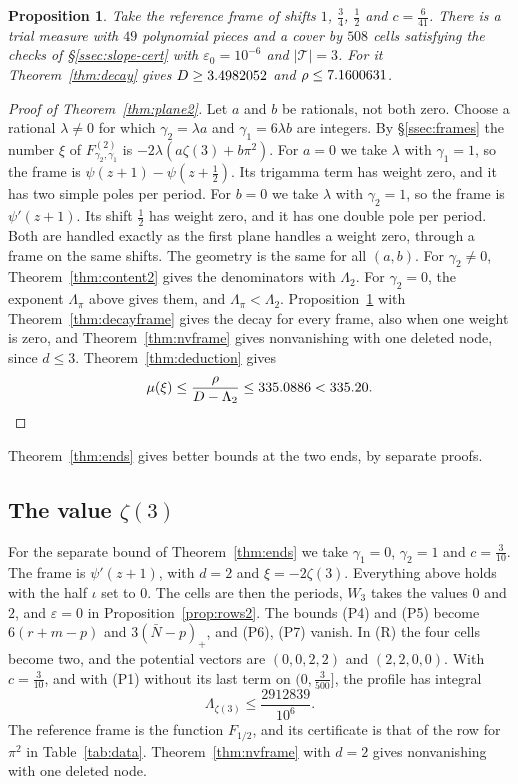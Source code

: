 \documentclass[11pt]{amsart}
\newtheorem{proposition}[theorem]{Proposition}
\theoremstyle{definition}
\theoremstyle{remark}
\numberwithin{equation}{section}
\newcommand{\MuPlaneB}{335.20}
\begin{document}
\begin{proposition}\label{prop:cert2}
Take the reference frame of shifts $1$, $\frac34$, $\frac12$ and $c=\frac6{41}$. There is a trial measure with $49$
polynomial pieces and a cover by $508$ cells satisfying the checks of \S\ref{ssec:slope-cert} with $\varepsilon_0=10^{-6}$
and $|\mathcal T|=3$. For it Theorem~\ref{thm:decay} gives $D\ge3.4982052$ and $\rho\le7.1600631$.
\end{proposition}

\begin{proof}[Proof of Theorem~\ref{thm:plane2}]
Let $a$ and $b$ be rationals, not both zero. Choose a rational $\lambda\ne0$ for which $\gamma_2=\lambda a$ and
$\gamma_1=6\lambda b$ are integers. By \S\ref{ssec:frames} the number $\xi$ of $F^{(2)}_{\gamma_2,\gamma_1}$ is
$-2\lambda(a\zeta(3)+b\pi^2)$. For $a=0$ we take $\lambda$ with $\gamma_1=1$, so the frame is
$\psi(z+1)-\psi(z+\frac12)$. Its trigamma term has weight zero, and it has two simple poles per period. For $b=0$ we
take $\lambda$ with $\gamma_2=1$, so the frame is $\psi'(z+1)$. Its shift $\frac12$ has weight zero, and it has one double pole per
period. Both are handled exactly as the first plane handles a weight zero, through a frame on the same shifts. The
geometry is the same for all $(a,b)$. For $\gamma_2\ne0$, Theorem~\ref{thm:content2} gives the denominators with
$\Lambda_2$. For $\gamma_2=0$, the exponent $\Lambda_\pi$ above gives them, and $\Lambda_\pi<\Lambda_2$.
Proposition~\ref{prop:cert2} with Theorem~\ref{thm:decayframe} gives the decay for every frame, also when one weight is
zero, and Theorem~\ref{thm:nvframe} gives nonvanishing with one deleted node, since $d\le3$. Theorem~\ref{thm:deduction}
gives
\[
 \mu(\xi)\le\frac\rho{D-\Lambda_2}\le\ExpPlB<\MuPlaneB .\qedhere
\]
\end{proof}

Theorem~\ref{thm:ends} gives better bounds at the two ends, by separate proofs.

\subsection{The value $\zeta(3)$}\label{ssec:zeta3}
For the separate bound of Theorem~\ref{thm:ends} we take $\gamma_1=0$, $\gamma_2=1$ and $c=\frac3{10}$. The frame is
$\psi'(z+1)$, with $d=2$ and $\xi=-2\zeta(3)$. Everything above holds with the half $\iota$ set to $0$. The cells are
then the periods, $W_3$ takes the values $0$ and $2$, and $\varepsilon=0$ in Proposition~\ref{prop:rows2}. The bounds (P4)
and (P5) become $6(r+m-p)$ and $3(\bar N-p)_+$, and (P6), (P7) vanish. In (R) the four cells become two, and the
potential vectors are $(0,0,2,2)$ and $(2,2,0,0)$. With $c=\frac3{10}$, and with (P1) without its last term on
$(0,\frac3{500}]$, the profile has integral
\[
 \Lambda_{\zeta(3)}\le\frac{2912839}{10^6}.
\]
The reference frame is the function $F_{1/2}$, and its certificate is that of the row for $\pi^2$ in
Table~\ref{tab:data}. Theorem~\ref{thm:nvframe} with $d=2$ gives nonvanishing with one deleted node.
\end{document}
